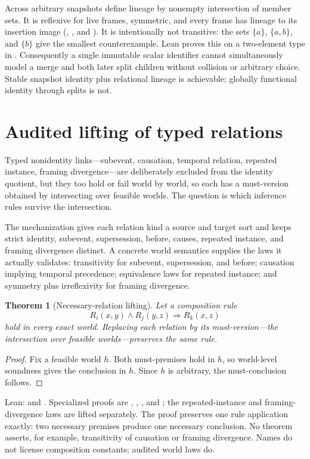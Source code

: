 \documentclass[11pt]{article}
\newtheorem{theorem}{Theorem}[section]
\theoremstyle{definition}
\theoremstyle{remark}
\begin{document}
Across arbitrary snapshots define lineage by nonempty intersection of member
sets.  It is reflexive for live frames, symmetric, and every frame has lineage
to its insertion image (, , and
).  It is intentionally not transitive: the sets
$\{a\}$, $\{a,b\}$, and $\{b\}$ give the smallest counterexample.  Lean proves
this on a two-element type in .  Consequently a
single immutable scalar identifier cannot simultaneously model a merge and
both later split children without collision or arbitrary choice.  Stable
snapshot identity plus relational lineage is achievable; globally functional
identity through splits is not.

\section{Audited lifting of typed relations}\label{sec:relations}

Typed nonidentity links---subevent, causation, temporal relation, repeated
instance, framing divergence---are deliberately excluded from the identity
quotient, but they too hold or fail world by world, so each has a
must-version obtained by intersecting over feasible worlds.  The question is
which inference rules survive the intersection.

The mechanization gives each relation kind a source and target sort and keeps
strict identity, subevent, supersession, before, causes, repeated instance, and
framing divergence distinct.  A concrete world semantics supplies the laws it
actually validates: transitivity for subevent, supersession, and before;
causation implying temporal precedence; equivalence laws for repeated
instance; and symmetry plus irreflexivity for framing divergence.

\begin{theorem}[Necessary-relation lifting]
Let a composition rule
\[
 R_i(x,y)\land R_j(y,z)\Longrightarrow R_k(x,z)
\]
hold in every exact world.  Replacing each relation by its must-version---the
intersection over feasible worlds---preserves the same rule.
\end{theorem}
\begin{proof}
Fix a feasible world $h$.  Both must-premises hold in $h$, so world-level
soundness gives the conclusion in $h$.  Since $h$ is arbitrary, the
must-conclusion follows.
\end{proof}
\noindent Lean:  and .  Specialized
proofs are , ,
, and ; the repeated-instance and
framing-divergence laws are lifted separately.  The proof preserves one rule
application exactly: two necessary premises produce one necessary conclusion.
No theorem asserts, for example, transitivity of causation or framing
divergence.  Names do not license composition constants; audited world laws do.
\end{document}
